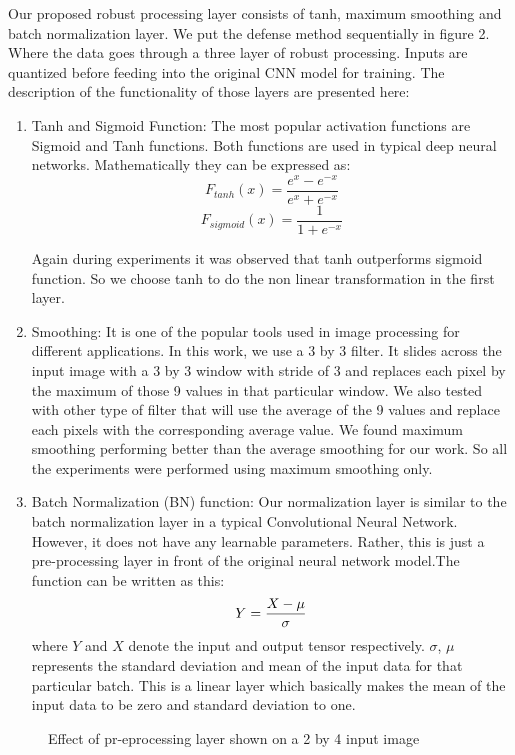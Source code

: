 \documentclass[conference]{IEEEtran}
\begin{document}
Our proposed robust processing layer consists of tanh, maximum smoothing and batch normalization layer. We put the defense method sequentially in figure 2. Where the data goes through a three layer of robust processing. Inputs are quantized before feeding into the original CNN model for training. The description of the functionality of those layers are presented here:
\begin{enumerate}
    \item Tanh and Sigmoid Function: The most popular activation functions are Sigmoid and Tanh functions. Both functions are used in typical deep neural networks. Mathematically they can be expressed as:
    \begin{equation}
    F_{tanh}(x)=\frac{e^x-e^{-x}}{e^x+e^{-x}} 
    \end{equation}
    \begin{equation} F_{sigmoid}(x)=\frac{1}{1+e^{-x}} 
    \end{equation}

Again during experiments it was observed that tanh outperforms sigmoid function. So we choose tanh to do the non linear transformation in the first layer.
    
    \item Smoothing: It is one of the popular tools used in image processing for different applications. In this work, we use a 3 by 3 filter. It slides across the input image with a 3 by 3 window with stride of 3 and replaces each pixel by the maximum of those 9 values in that particular window. We also tested with other type of filter that will use the average of the 9 values and replace each pixels with the corresponding average value. We found maximum smoothing performing better than the average smoothing for our work. So all the experiments were performed using maximum smoothing only.
    \item Batch Normalization (BN) function: Our normalization layer is similar to the batch normalization layer in a typical Convolutional Neural Network. However, it does not have any learnable parameters. Rather, this is just a pre-processing layer in front of the original neural network model.The function can be written as this: 
    \begin{equation}
\small Y=\frac{X-\mu}{{\sigma}}
\end{equation}
where $Y$ and $X$ denote the input and output tensor respectively. $\sigma$, $\mu$ represents the standard deviation and mean of the input data for that particular batch. This is a linear layer which basically makes the mean of the input data to be zero and standard deviation to one.
\end{enumerate}\begin{figure}[h]
\centering
{}
\caption{Effect of pr-eprocessing layer shown on a 2 by 4 input image}
\end{figure}
\end{document}

